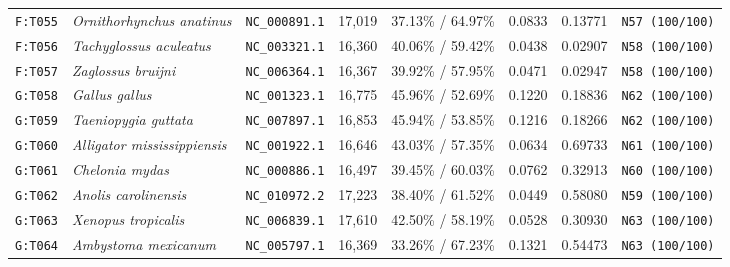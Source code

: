 \documentclass[10pt,letterpaper]{article}
\begin{document}
\begin{longtable}{llllllll}
\texttt{F:T055} & \textit{Ornithorhynchus anatinus} & \texttt{NC\_000891.1} & 17,019 & 37.13\% / 64.97\% & 0.0833 & 0.13771 & \texttt{N57 (100/100)} \\
\texttt{F:T056} & \textit{Tachyglossus aculeatus} & \texttt{NC\_003321.1} & 16,360 & 40.06\% / 59.42\% & 0.0438 & 0.02907 & \texttt{N58 (100/100)} \\
\texttt{F:T057} & \textit{Zaglossus bruijni} & \texttt{NC\_006364.1} & 16,367 & 39.92\% / 57.95\% & 0.0471 & 0.02947 & \texttt{N58 (100/100)} \\
\texttt{G:T058} & \textit{Gallus gallus} & \texttt{NC\_001323.1} & 16,775 & 45.96\% / 52.69\% & 0.1220 & 0.18836 & \texttt{N62 (100/100)} \\
\texttt{G:T059} & \textit{Taeniopygia guttata} & \texttt{NC\_007897.1} & 16,853 & 45.94\% / 53.85\% & 0.1216 & 0.18266 & \texttt{N62 (100/100)} \\
\texttt{G:T060} & \textit{Alligator mississippiensis} & \texttt{NC\_001922.1} & 16,646 & 43.03\% / 57.35\% & 0.0634 & 0.69733 & \texttt{N61 (100/100)} \\
\texttt{G:T061} & \textit{Chelonia mydas} & \texttt{NC\_000886.1} & 16,497 & 39.45\% / 60.03\% & 0.0762 & 0.32913 & \texttt{N60 (100/100)} \\
\texttt{G:T062} & \textit{Anolis carolinensis} & \texttt{NC\_010972.2} & 17,223 & 38.40\% / 61.52\% & 0.0449 & 0.58080 & \texttt{N59 (100/100)} \\
\texttt{G:T063} & \textit{Xenopus tropicalis} & \texttt{NC\_006839.1} & 17,610 & 42.50\% / 58.19\% & 0.0528 & 0.30930 & \texttt{N63 (100/100)} \\
\texttt{G:T064} & \textit{Ambystoma mexicanum} & \texttt{NC\_005797.1} & 16,369 & 33.26\% / 67.23\% & 0.1321 & 0.54473 & \texttt{N63 (100/100)} \\
\bottomrule
\end{longtable}
\end{document}
